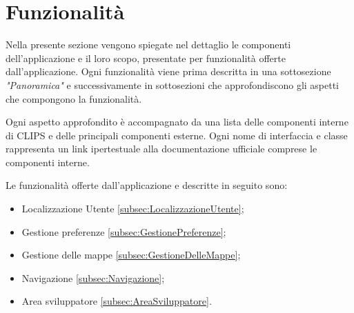 \documentclass[../ManualeSviluppatore.tex]{subfiles}
\begin{document}
\section{Funzionalità}
	Nella presente sezione vengono spiegate nel dettaglio le componenti dell'applicazione e il loro scopo, presentate per funzionalità offerte dall'applicazione.
	Ogni funzionalità viene prima descritta in una sottosezione \textit{"Panoramica"} e successivamente in sottosezioni che approfondiscono gli aspetti che compongono la funzionalità. 
	
	Ogni aspetto approfondito è accompagnato da una lista delle componenti interne di CLIPS e delle principali componenti esterne. Ogni nome di interfaccia e classe rappresenta un link ipertestuale alla documentazione ufficiale comprese le componenti interne. 
	
	Le funzionalità offerte dall'applicazione e descritte in seguito sono:
	\begin{itemize}
		\item Localizzazione Utente \ref{subsec:LocalizzazioneUtente};
		\item Gestione preferenze \ref{subsec:GestionePreferenze};
		\item Gestione delle mappe \ref{subsec:GestioneDelleMappe};
		\item Navigazione \ref{subsec:Navigazione};
		\item Area sviluppatore \ref{subsec:AreaSviluppatore}.
	\end{itemize}
	
	\newpage
	
	
	\newpage
	
	
	\newpage
	
	
	\newpage
	
	
	\newpage
	
\end{document}
